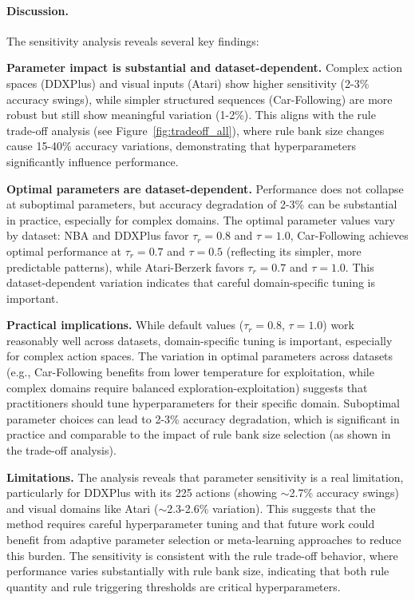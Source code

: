 \documentclass{article} %
\newcommand{\revise}[1]{#1}
\begin{document}
\revise{\paragraph{Discussion.}
The sensitivity analysis reveals several key findings:}

\revise{\textbf{Parameter impact is substantial and dataset-dependent.} Complex action spaces (DDXPlus) and visual inputs (Atari) show higher sensitivity (2-3\% accuracy swings), while simpler structured sequences (Car-Following) are more robust but still show meaningful variation (1-2\%). This aligns with the rule trade-off analysis (see Figure~\ref{fig:tradeoff_all}), where rule bank size changes cause 15-40\% accuracy variations, demonstrating that hyperparameters significantly influence performance.}

\revise{\textbf{Optimal parameters are dataset-dependent.} Performance does not collapse at suboptimal parameters, but accuracy degradation of 2-3\% can be substantial in practice, especially for complex domains. The optimal parameter values vary by dataset: NBA and DDXPlus favor $\tau_r=0.8$ and $\tau=1.0$, Car-Following achieves optimal performance at $\tau_r=0.7$ and $\tau=0.5$ (reflecting its simpler, more predictable patterns), while Atari-Berzerk favors $\tau_r=0.7$ and $\tau=1.0$. This dataset-dependent variation indicates that careful domain-specific tuning is important.}

\revise{\textbf{Practical implications.} While default values ($\tau_r = 0.8$, $\tau = 1.0$) work reasonably well across datasets, domain-specific tuning is important, especially for complex action spaces. The variation in optimal parameters across datasets (e.g., Car-Following benefits from lower temperature for exploitation, while complex domains require balanced exploration-exploitation) suggests that practitioners should tune hyperparameters for their specific domain. Suboptimal parameter choices can lead to 2-3\% accuracy degradation, which is significant in practice and comparable to the impact of rule bank size selection (as shown in the trade-off analysis).}

\revise{\textbf{Limitations.} The analysis reveals that parameter sensitivity is a real limitation, particularly for DDXPlus with its 225 actions (showing $\sim$2.7\% accuracy swings) and visual domains like Atari ($\sim$2.3-2.6\% variation). This suggests that the method requires careful hyperparameter tuning and that future work could benefit from adaptive parameter selection or meta-learning approaches to reduce this burden. The sensitivity is consistent with the rule trade-off behavior, where performance varies substantially with rule bank size, indicating that both rule quantity and rule triggering thresholds are critical hyperparameters.}
\end{document}
